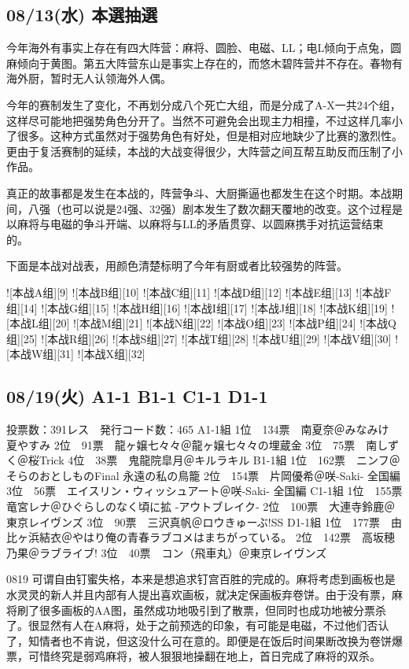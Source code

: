 \subsection{08/13(水) 本選抽選}

今年海外有事实上存在有四大阵营：麻将、圆脸、电磁、LL；电L倾向于点兔，圆麻倾向于黄图。第五大阵营东山是事实上存在的，而悠木碧阵营并不存在。春物有海外厨，暂时无人认领海外人偶。

今年的赛制发生了变化，不再划分成八个死亡大组，而是分成了A-X一共24个组，这样尽可能地把强势角色分开了。当然不可避免会出现主力相撞，不过这样几率小了很多。这种方式虽然对于强势角色有好处，但是相对应地缺少了比赛的激烈性。更由于复活赛制的延续，本战的大战变得很少，大阵营之间互帮互助反而压制了小作品。

真正的故事都是发生在本战的，阵营争斗、大厨撕逼也都发生在这个时期。本战期间，八强（也可以说是24强、32强）剧本发生了数次翻天覆地的改变。这个过程是以麻将与电磁的争斗开端、以麻将与LL的矛盾贯穿、以圆麻携手对抗运营结束的。

下面是本战对战表，用颜色清楚标明了今年有厨或者比较强势的阵营。

![本战A组][9]
![本战B组][10]
![本战C组][11]
![本战D组][12]
![本战E组][13]
![本战F组][14]
![本战G组][15]
![本战H组][16]
![本战I组][17]
![本战J组][18]
![本战K组][19]
![本战L组][20]
![本战M组][21]
![本战N组][22]
![本战O组][23]
![本战P组][24]
![本战Q组][25]
![本战R组][26]
![本战S组][27]
![本战T组][28]
![本战U组][29]
![本战V组][30]
![本战W组][31]
![本战X组][32]

\subsection{08/19(火) A1-1 B1-1 C1-1 D1-1}

	投票数：391レス　発行コード数：465
	A1-1組
	1位　134票　南夏奈＠みなみけ 夏やすみ
	2位　91票　龍ヶ嬢七々々＠龍ヶ嬢七々々の埋蔵金
	3位　75票　南しずく＠桜Trick
	4位　38票　鬼龍院皐月＠キルラキル
	B1-1組
	1位　162票　ニンフ＠そらのおとしものFinal 永遠の私の鳥籠
	2位　154票　片岡優希＠咲-Saki- 全国編
	3位　56票　エイスリン・ウィッシュアート＠咲-Saki- 全国編
	C1-1組
	1位　155票　竜宮レナ＠ひぐらしのなく頃に拡 -アウトブレイク-
	2位　100票　大連寺鈴鹿＠東京レイヴンズ
	3位　90票　三沢真帆＠ロウきゅーぶ!SS
	D1-1組
	1位　177票　由比ヶ浜結衣＠やはり俺の青春ラブコメはまちがっている。
	2位　142票　高坂穂乃果＠ラブライブ!
	3位　40票　コン（飛車丸）＠東京レイヴンズ

0819 可谓自由钉蜜失格，本来是想追求钉宫百胜的完成的。麻将考虑到画板也是水灵灵的新人并且内部有人提出喜欢画板，就决定保画板弃卷饼。由于没有票，麻将刷了很多画板的AA图，虽然成功地吸引到了散票，但同时也成功地被分票杀了。很显然有人在A麻将，处于之前预选的印象，有可能是电磁，不过他们否认了，知情者也不肯说，但这没什么可在意的。即便是在饭后时间果断改换为卷饼爆票，可惜终究是弱鸡麻将，被人狠狠地操翻在地上，首日完成了麻将的双杀。

